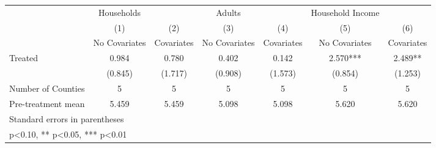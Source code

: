 {
\def\sym#1{\ifmmode^{#1}\else\(^{#1}\)\fi}
\begin{tabular}{l*{6}{c}}
\hline\hline
            &  Households   &               &      Adults   &               &Household Income   &               \\
            &\multicolumn{1}{c}{(1)}&\multicolumn{1}{c}{(2)}&\multicolumn{1}{c}{(3)}&\multicolumn{1}{c}{(4)}&\multicolumn{1}{c}{(5)}&\multicolumn{1}{c}{(6)}\\
            &\multicolumn{1}{c}{No Covariates}&\multicolumn{1}{c}{Covariates}&\multicolumn{1}{c}{No Covariates}&\multicolumn{1}{c}{Covariates}&\multicolumn{1}{c}{No Covariates}&\multicolumn{1}{c}{Covariates}\\
\hline
Treated     &       0.984   &       0.780   &       0.402   &       0.142   &       2.570***&       2.489** \\
            &     (0.845)   &     (1.717)   &     (0.908)   &     (1.573)   &     (0.854)   &     (1.253)   \\
\hline
Number of Counties&           5   &           5   &           5   &           5   &           5   &           5   \\
Pre-treatment mean&       5.459   &       5.459   &       5.098   &       5.098   &       5.620   &       5.620   \\
\hline\hline
\multicolumn{7}{l}{\footnotesize Standard errors in parentheses}\\
\multicolumn{7}{l}{\footnotesize * p<0.10, ** p<0.05, *** p<0.01}\\
\end{tabular}
}
